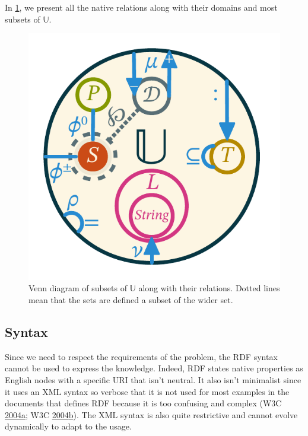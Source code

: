 \documentclass[11pt,a4paper,twoside,openright,titlepage,numbers=noenddot,headinclude,cleardoublepage=empty,openany]{scrreprt}
\theoremstyle{plain}
\theoremstyle{definition}
\theoremstyle{remark}
\newcommand{\bb}{\mathbb}
\begin{document}
In \cref{fig:typerel}, we present all the native relations along with
their domains and most subsets of \(\bb{U}\).

\begin{figure}
\hypertarget{fig:typerel}{%
\centering
\includegraphics{./tex2pdf.-0b80fea6fd6da7f9/df0077c678c03d645f8a0dd2633db823c31198a2.pdf}
\caption{Venn diagram of subsets of \(\bb{U}\) along with their
relations. Dotted lines mean that the sets are defined a subset of the
wider set.}\label{fig:typerel}
}
\end{figure}

\hypertarget{syntax}{%
\subsection{Syntax}\label{syntax}}

Since we need to respect the requirements of the problem, the RDF syntax
cannot be used to express the knowledge. Indeed, RDF states native
properties as English nodes with a specific URI that isn't neutral. It
also isn't minimalist since it uses an XML syntax so verbose that it is
not used for most examples in the documents that defines RDF because it
is too confusing and complex (W3C
\protect\hyperlink{ref-w3c_rdf_2004a}{2004}\protect\hyperlink{ref-w3c_rdf_2004a}{a};
W3C
\protect\hyperlink{ref-w3c_rdf_2004}{2004}\protect\hyperlink{ref-w3c_rdf_2004}{b}).
The XML syntax is also quite restrictive and cannot evolve dynamically
to adapt to the usage.
\end{document}
